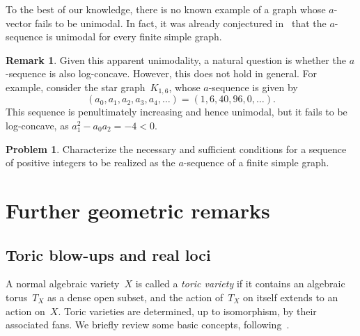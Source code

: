 \documentclass[10pt]{amsart}
\theoremstyle{plain}
\numberwithin{equation}{section}
\theoremstyle{definition}
\newtheorem{remark}[theorem]{Remark}
\newtheorem{problem}[theorem]{Problem}
\begin{document}
To the best of our knowledge, there is no known example of a graph whose $a$-vector fails to be unimodal.
In fact, it was already conjectured in~\cite{Choi-Yoon2026} that the $a$-sequence is unimodal for every finite simple graph.

\begin{remark} \label{rem:non_log_concave_exam}
    Given this apparent unimodality, a natural question is whether the $a$-sequence is also log-concave.
    However, this does not hold in general.
    For example, consider the star graph~$K_{1,6}$, whose $a$-sequence is given by
    $$
        (a_0,a_1,a_2,a_3,a_4,\ldots) = (1,6,40,96,0,\ldots).
    $$
    This sequence is penultimately increasing and hence unimodal, but it fails to be log-concave, as $a_1^2 - a_0a_2 = -4 < 0$.
\end{remark}



\begin{problem} \label{prob:g-conjecture}
  Characterize the necessary and sufficient conditions for a sequence of positive integers to be realized as the $a$-sequence of a finite simple graph.
\end{problem}

\section{Further geometric remarks}\label{sec:blow-ups}

\subsection{Toric blow-ups and real loci}\label{subsec:blow-ups}

A normal algebraic variety~$X$ is called a \emph{toric variety} if it contains an algebraic torus~$T_X$ as a dense open subset, and the action of~$T_X$ on itself extends to an action on~$X$.
Toric varieties are determined, up to isomorphism, by their associated fans.
We briefly review some basic concepts, following~\cite{Cox_toric_book}.
\end{document}
